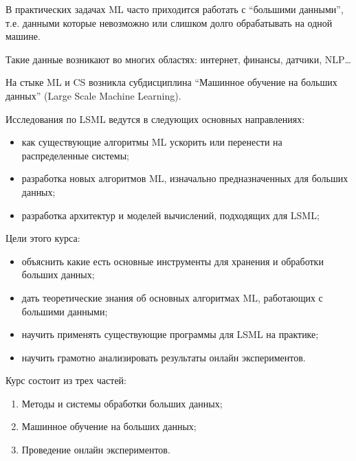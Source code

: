 В практических задачах ML часто приходится работать с “большими данными”, т.е. данными которые невозможно или слишком долго обрабатывать на одной машине. \newline

Такие данные возникают во многих областях: интернет, финансы, датчики, NLP… \newline

На стыке ML и CS возникла субдисциплина “Машинное обучение на больших данных” (Large Scale Machine Learning). \newline

Исследования по LSML ведутся в следующих основных направлениях:
\begin{itemize}
    \item как существующие алгоритмы ML ускорить или перенести на распределенные системы;
    \item разработка новых алгоритмов ML, изначально предназначенных для больших данных;
    \item разработка архитектур и моделей вычислений, подходящих для LSML;
\end{itemize}
$ $\\ 
Цели этого курса:
\begin{itemize}
    \item объяснить какие есть основные инструменты для хранения и обработки больших данных;
    \item дать теоретические знания об основных алгоритмах ML, работающих с большими данными;
    \item научить применять существующие программы для LSML на практике;
    \item научить грамотно анализировать результаты онлайн экспериментов.
\end{itemize}
$ $\\ 
Курс состоит из трех частей:
\begin{enumerate}
    \item Методы и системы обработки больших данных;
    \item Машинное обучение на больших данных;
    \item Проведение онлайн экспериментов.
\end{enumerate}